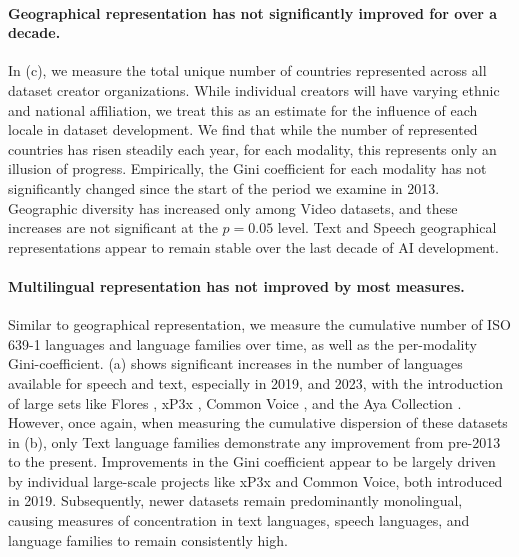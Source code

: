 \paragraph{Geographical representation has not significantly improved for over a decade.}
In (c), we measure the total unique number of countries represented across all dataset creator organizations. While individual creators will have varying ethnic and national affiliation, we treat this as an estimate for the influence of each locale in dataset development. We find that while the number of represented countries has risen steadily each year, for each modality, this represents only an illusion of progress. Empirically, the Gini coefficient for each modality has not significantly changed since the start of the period we examine in 2013. Geographic diversity has increased only among Video datasets, and these increases are not significant at the $p = 0.05$ level. Text and Speech geographical representations appear to remain stable over the last decade of AI development.

\vspace{-2mm}
\paragraph{Multilingual representation has not improved by most measures.}
Similar to geographical representation, we measure the cumulative number of ISO 639-1 languages and language families over time, as well as the per-modality Gini-coefficient.
(a) shows significant increases in the number of languages available for speech and text, especially in 2019, and 2023, with the introduction of large sets like Flores \citep{goyal2022flores}, xP3x \citep{muennighoff2023crosslingual}, Common Voice \citep{ardila2019common}, and the Aya Collection \citep{singh2024aya}. However, once again, when measuring the cumulative dispersion of these datasets in (b), only Text language families demonstrate any improvement from pre-2013 to the present. Improvements in the Gini coefficient appear to be largely driven by individual large-scale projects like xP3x and Common Voice, both introduced in 2019. Subsequently, newer datasets remain predominantly monolingual, causing measures of concentration in text languages, speech languages, and language families to remain consistently high.

